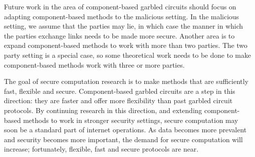 Future work in the area of component-based garbled circuits should focus on adapting component-based methods to the malicious setting.
In the malicious setting, we assume that the parties may lie, in which case the manner in which the parties exchange links needs to be made more secure.
Another area is to expand component-based methods to work with more than two parties.
The two party setting is a special case, so some theoretical work needs to be done to make component-based methods work with three or more parties.

The goal of secure computation research is to make methods that are sufficiently fast, flexible and secure.
Component-based garbled circuits are a step in this direction: they are faster and offer more flexibility than past garbled circuit protocols.
By continuing research in this direction, and extending component-based methods to work in stronger security settings, secure computation may soon be a standard part of internet operations.
As data becomes more prevalent and security becomes more important, the demand for secure computation will increase; fortunately, flexible, fast and secure protocols are near.
